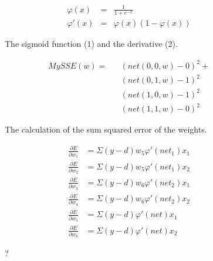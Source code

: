 \documentclass{article}
\begin{document}
\begin{figure}[H]
	\centering
	\begin{eqnarray}
	 \varphi(x) & = & \frac{1}{1 + e^{-x}} \\
	   \varphi'(x) & = & \varphi(x)(1 - \varphi(x))
	\end{eqnarray}
	\caption{The sigmoid function (1) and the derivative (2).}
\end{figure}

\begin{figure}[H]
	\centering
	\begin{eqnarray}
		MySSE(w) = && (net(0, 0, w) - 0)^2 + \\
				&& (net(0, 1, w) - 1)^2 \\
				&& (net(1, 0, w) - 1)^2 \\
				&& (net(1, 1, w) - 0)^2
	\end{eqnarray}
	\caption{The calculation of the sum squared error of the weights.}
\end{figure}

\begin{figure}[H]
	\centering
	\begin{eqnarray}
		\frac{\partial E}{\partial w_1} &= \Sigma{(y - d)w_5\varphi'(net_1)x_1} \\
		\frac{\partial E}{\partial w_2} &= \Sigma{(y - d)w_5\varphi'(net_1)x_2} \\
		\frac{\partial E}{\partial w_3} &= \Sigma{(y - d)w_6\varphi'(net_2)x_1} \\
		\frac{\partial E}{\partial w_4} &= \Sigma{(y - d)w_6\varphi'(net_2)x_2} \\
		\frac{\partial E}{\partial w_5} &= \Sigma{(y - d)\varphi'(net)x_1} \\
		\frac{\partial E}{\partial w_6} &= \Sigma{(y - d)\varphi'(net)x_2}
	\end{eqnarray}
	\caption{?}
\end{figure}
\end{document}
